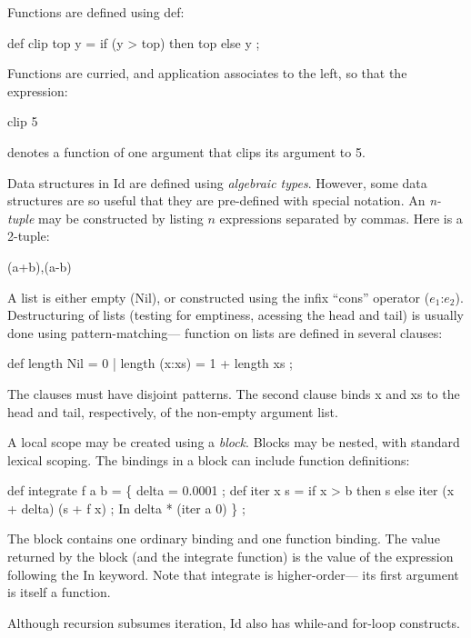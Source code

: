 Functions are defined using {\cf def}:

\beginid
def clip top y = if (y > top) then top else y ;
\endid

Functions are curried, and application associates to the left, so that
the expression:

\beginid
clip 5
\endid

denotes a function of one argument that clips its argument to 5.

Data structures in Id are defined using {\em algebraic types\/}.
However, some data structures are so useful that they are pre-defined
with special notation.  An {\em n-tuple\/} may be constructed by
listing $n$ expressions separated by commas.  Here is a 2-tuple:

\beginid
(a+b),(a-b)
\endid

A list is either empty ({\cf Nil}), or constructed using the infix
``cons'' operator ({\cf $e_{1}$:$e_{2}$}).  Destructuring of lists
(testing for emptiness, acessing the head and tail) is usually done
using pattern-matching--- function on lists are defined in several
clauses:

\beginid
def length Nil    = 0                         %
 |  length (x:xs) = 1 + length xs ;           %
\endid

 The clauses must have disjoint patterns.  The second clause binds
{\cf x} and {\cf xs} to the head and tail, respectively, of the
non-empty argument list.

A local scope may be created using a {\em block\/}. Blocks may be
nested, with standard lexical scoping.  The bindings in a block can
include function definitions:

\beginid
def integrate f a b = \{ delta = 0.0001 ;
                        def iter x s = if x > b then
                                         s
                                       else
                                         iter (x + delta) (s + f x) ;
                      In
                        delta * (iter a 0) \} ;
\endid

 The block contains one ordinary binding and one function binding.
The value returned by the block (and the {\cf integrate} function) is
the value of the expression following the {\cf In} keyword.  Note that
{\cf integrate} is higher-order--- its first argument is itself a
function.

Although recursion subsumes iteration, Id also has {\cf while}-and
{\cf for}-loop constructs.

